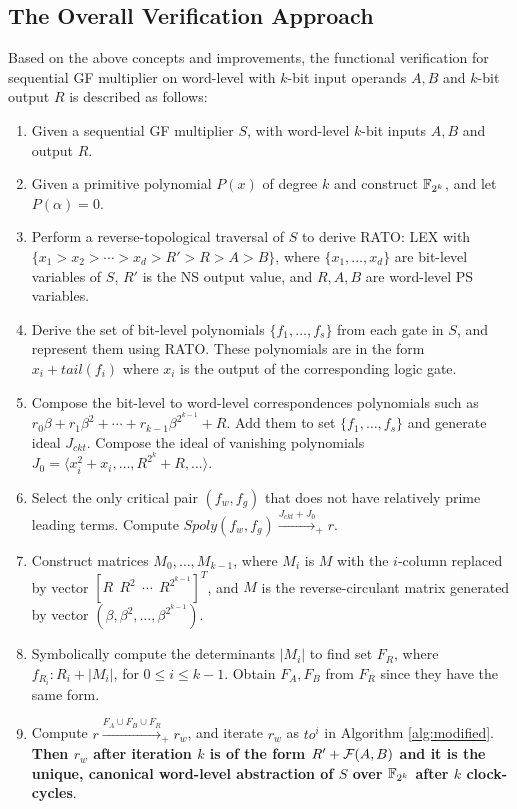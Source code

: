 \subsection{The Overall Verification Approach}
Based on the above concepts and improvements, the functional verification for sequential GF multiplier 
on word-level with $k$-bit input operands $A,B$ and $k$-bit output $R$ is described as follows:
\begin{enumerate}[{1)}]
\item Given a sequential GF multiplier $S$, with word-level $k$-bit inputs $A,B$ and output $R$.
\item Given a primitive polynomial $P(x)$ of degree $k$ and construct ${\mathbb{F}}_{2^k}$, and let $P(\alpha)=0$.
\item Perform a reverse-topological traversal of $S$ to derive RATO: LEX with $\{x_1>x_2>\cdots>x_d>R'>R>A>B\}$,
where $\{x_1,\dots,x_d\}$ are bit-level variables of $S$, $R'$ is the NS output value, and 
$R,A,B$ are word-level PS variables.
\item Derive the set of bit-level polynomials $\{f_1,\dots,f_s\}$ from each gate in $S$, and represent them 
using RATO. These polynomials are in the form $x_i+tail(f_i)$ where $x_i$ is the output of the corresponding logic gate.
\item Compose the bit-level to word-level correspondences polynomials such as $r_0\beta+r_1\beta^2+\cdots+r_{k-1}\beta^{2^{k-1}}+R$.
Add them to set $\{f_1,\dots,f_s\}$ and generate ideal $J_{ckt}$. Compose the ideal of vanishing polynomials
$J_0 = \langle x_i^2+x_i, \dots, R^{2^k}+R,\dots\rangle$.
\item Select the only critical pair $(f_w,f_g)$ that does not have relatively prime leading terms. Compute
$Spoly(f_w,f_g) \xrightarrow{J_{ckt}+J_0}_{+}r$.
\item Construct matrices $M_0,\dots,M_{k-1}$, where $M_i$ is $M$ with the $i$-column replaced by vector 
$[R~~R^2~~\cdots~~R^{2^{k-1}}]^T$, and $M$ is the reverse-circulant matrix generated by vector $(\beta,\beta^2,\dots,\beta^{2^{k-1}})$.
\item Symbolically compute the determinants $|M_i|$ to find set $F_R$, where $f_{R_i}:R_i+|M_i|$, for $0\leq i \leq k-1$.
Obtain $F_A, F_B$ from $F_R$ since they have the same form.
\item Compute $r \xrightarrow{F_A\cup F_B \cup F_R}_{+}r_w$, and iterate $r_w$ as $to^i$ in Algorithm \ref{alg:modified}.
{\bf Then $r_w$ after iteration $k$ is of the form $R'+{\mathcal{F}}(A,B)$ and it is the unique, canonical word-level abstraction
of $S$ over ${\mathbb{F}}_{2^k}$ after $k$ clock-cycles}.
\end{enumerate}

